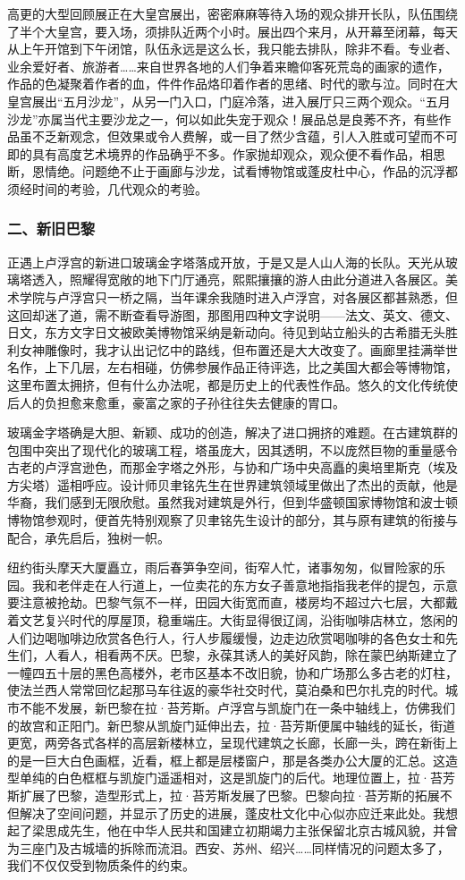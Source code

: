\documentclass{article}
\begin{document}
高更的大型回顾展正在大皇宫展出，密密麻麻等待入场的观众排开长队，队伍围绕了半个大皇宫，要入场，须排队近两个小时。展出四个来月，从开幕至闭幕，每天从上午开馆到下午闭馆，队伍永远是这么长，我只能去排队，除非不看。专业者、业余爱好者、旅游者……来自世界各地的人们争着来瞻仰客死荒岛的画家的遗作，作品的色凝聚着作者的血，件件作品烙印着作者的思绪、时代的歌与泣。同时在大皇宫展出“五月沙龙”，从另一门入口，门庭冷落，进入展厅只三两个观众。“五月沙龙”亦属当代主要沙龙之一，何以如此失宠于观众！展品总是良莠不齐，有些作品虽不乏新观念，但效果或令人费解，或一目了然少含蕴，引人入胜或可望而不可即的具有高度艺术境界的作品确乎不多。作家抛却观众，观众便不看作品，相思断，恩情绝。问题绝不止于画廊与沙龙，试看博物馆或蓬皮杜中心，作品的沉浮都须经时间的考验，几代观众的考验。
\subsubsection{二、新旧巴黎}
正遇上卢浮宫的新进口玻璃金字塔落成开放，于是又是人山人海的长队。天光从玻璃塔透入，照耀得宽敞的地下门厅通亮，熙熙攘攘的游人由此分道进入各展区。美术学院与卢浮宫只一桥之隔，当年课余我随时进入卢浮宫，对各展区都甚熟悉，但这回却迷了道，需不断查看导游图，那图用四种文字说明——法文、英文、德文、日文，东方文字日文被欧美博物馆采纳是新动向。待见到站立船头的古希腊无头胜利女神雕像时，我才认出记忆中的路线，但布置还是大大改变了。画廊里挂满举世名作，上下几层，左右相碰，仿佛参展作品正待评选，比之美国大都会等博物馆，这里布置太拥挤，但有什么办法呢，都是历史上的代表性作品。悠久的文化传统使后人的负担愈来愈重，豪富之家的子孙往往失去健康的胃口。

玻璃金字塔确是大胆、新颖、成功的创造，解决了进口拥挤的难题。在古建筑群的包围中突出了现代化的玻璃工程，塔虽庞大，因其透明，不以庞然巨物的重量感令古老的卢浮宫逊色，而那金字塔之外形，与协和广场中央高矗的奥培里斯克（埃及方尖塔）遥相呼应。设计师贝聿铭先生在世界建筑领域里做出了杰出的贡献，他是华裔，我们感到无限欣慰。虽然我对建筑是外行，但到华盛顿国家博物馆和波士顿博物馆参观时，便首先特别观察了贝聿铭先生设计的部分，其与原有建筑的衔接与配合，承先启后，独树一帜。

纽约街头摩天大厦矗立，雨后春笋争空间，街窄人忙，诸事匆匆，似冒险家的乐园。我和老伴走在人行道上，一位卖花的东方女子善意地指指我老伴的提包，示意要注意被抢劫。巴黎气氛不一样，田园大街宽而直，楼房均不超过六七层，大都戴着文艺复兴时代的厚屋顶，稳重端庄。大街显得很辽阔，沿街咖啡店林立，悠闲的人们边喝咖啡边欣赏各色行人，行人步履缓慢，边走边欣赏喝咖啡的各色女士和先生们，人看人，相看两不厌。巴黎，永葆其诱人的美好风韵，除在蒙巴纳斯建立了一幢四五十层的黑色高楼外，老市区基本不改旧貌，协和广场那么多古老的灯柱，使法兰西人常常回忆起那马车往返的豪华社交时代，莫泊桑和巴尔扎克的时代。城市不能不发展，新巴黎在拉·苔芳斯。卢浮宫与凯旋门在一条中轴线上，仿佛我们的故宫和正阳门。新巴黎从凯旋门延伸出去，拉·苔芳斯便属中轴线的延长，街道更宽，两旁各式各样的高层新楼林立，呈现代建筑之长廊，长廊一头，跨在新街上的是一巨大白色画框，近看，框上都是层楼窗户，那是各类办公大厦的汇总。这造型单纯的白色框框与凯旋门遥遥相对，这是凯旋门的后代。地理位置上，拉·苔芳斯扩展了巴黎，造型形式上，拉·苔芳斯发展了巴黎。巴黎向拉·苔芳斯的拓展不但解决了空间问题，并显示了历史的进展，蓬皮杜文化中心似亦应迁来此处。我想起了梁思成先生，他在中华人民共和国建立初期竭力主张保留北京古城风貌，并曾为三座门及古城墙的拆除而流泪。西安、苏州、绍兴……同样情况的问题太多了，我们不仅仅受到物质条件的约束。
\end{document}
